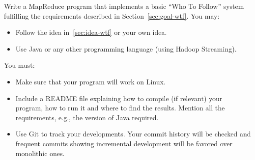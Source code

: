 \documentclass[11pt]{article}
\begin{document}
Write a MapReduce program that implements a basic ``Who To Follow'' system
fulfilling the requirements described in Section~\ref{sec:goal-wtf}. You may:
\begin{itemize}
\item Follow the
  idea in~\ref{sec:idea-wtf} or your own idea.
\item Use Java or any other programming language (using Hadoop
  Streaming).
\end{itemize}
You must:
\begin{itemize}
\item Make sure that your program will work on Linux.
\item Include a README file explaining how to compile (if relevant)
  your program, how to run it and where to find the results. Mention all the
  requirements, e.g., the version of Java required.
\item Use Git to track your developments. Your commit history will be
  checked and frequent commits showing incremental development will be
  favored over monolithic ones.
\end{itemize}
\end{document}
